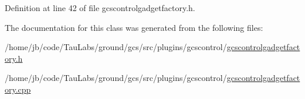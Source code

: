 \-Definition at line 42 of file gcscontrolgadgetfactory.\-h.



\-The documentation for this class was generated from the following files\-:\begin{DoxyCompactItemize}
\item 
/home/jb/code/\-Tau\-Labs/ground/gcs/src/plugins/gcscontrol/\hyperlink{gcscontrolgadgetfactory_8h}{gcscontrolgadgetfactory.\-h}\item 
/home/jb/code/\-Tau\-Labs/ground/gcs/src/plugins/gcscontrol/\hyperlink{gcscontrolgadgetfactory_8cpp}{gcscontrolgadgetfactory.\-cpp}\end{DoxyCompactItemize}
